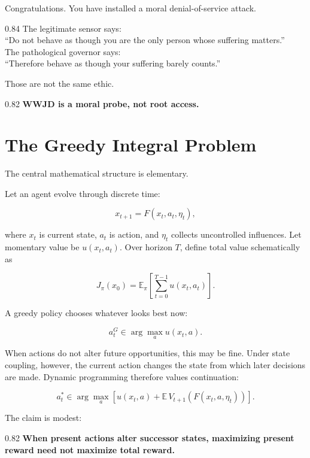 \documentclass[10pt,letterpaper]{article}
\newenvironment{paperbody}
  {\begingroup\justifying}
  {\par\endgroup}
\newenvironment{dialoguebox}
  {\Needspace{5\baselineskip}\par\vspace{0.26em}\begin{center}\begingroup
   \begin{lrbox}{\dialogueboxsave}\begin{varwidth}{0.84\linewidth}
   \small\rmfamily\upshape\RaggedRight}
  {\end{varwidth}\end{lrbox}\fbox{\usebox{\dialogueboxsave}}
   \endgroup\end{center}\vspace{0.26em}}
\newenvironment{thesisbox}
  {\Needspace{3.5\baselineskip}\par\vspace{0.32em}\begin{center}\begingroup
   \begin{lrbox}{\thesisboxsave}\begin{varwidth}{0.82\linewidth}
   \normalsize\rmfamily\bfseries\upshape\RaggedRight}
  {\end{varwidth}\end{lrbox}\fbox{\usebox{\thesisboxsave}}
   \endgroup\end{center}\vspace{0.32em}}
\let\oldsection\section
\renewcommand{\section}{\Needspace{6\baselineskip}\oldsection}
\begin{document}
\begin{paperbody}
Congratulations. You have installed a moral denial-of-service attack.

\begin{dialoguebox}
The legitimate sensor says:\\
``Do not behave as though you are the only person whose suffering
matters.''\\[0.35em]
The pathological governor says:\\
``Therefore behave as though your suffering barely counts.''
\end{dialoguebox}

Those are not the same ethic.

\begin{thesisbox}
WWJD is a moral probe, not root access.
\end{thesisbox}

\section{The Greedy Integral
Problem}\label{the-greedy-integral-problem}

The central mathematical structure is elementary.

Let an agent evolve through discrete time:

\[
x_{t+1}=F(x_t,a_t,\eta_t),
\]

where \(x_t\) is current state, \(a_t\) is action, and \(\eta_t\)
collects uncontrolled influences. Let momentary value be \(u(x_t,a_t)\).
Over horizon \(T\), define total value schematically as

\[
J_\pi(x_0)=
\mathbb E_\pi
\left[
\sum_{t=0}^{T-1}u(x_t,a_t)
\right].
\]

A greedy policy chooses whatever looks best now:

\[
a_t^G\in\arg\max_a u(x_t,a).
\]

When actions do not alter future opportunities, this may be fine. Under
state coupling, however, the current action changes the state from which
later decisions are made. Dynamic programming therefore values
continuation:

\[
a_t^*\in\arg\max_a
\left[
u(x_t,a)+
\mathbb E\,V_{t+1}(F(x_t,a,\eta_t))
\right].
\]

The claim is modest:

\begin{thesisbox}
When present actions alter successor states, maximizing present
reward need not maximize total reward.
\end{thesisbox}


\end{paperbody}
\end{document}
